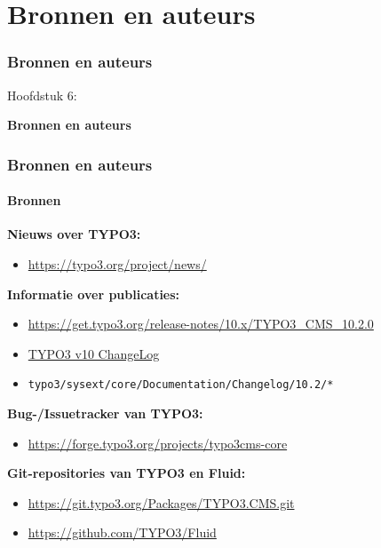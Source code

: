%

\section{Bronnen en auteurs}
\begin{frame}[fragile]
	\frametitle{Bronnen en auteurs}

	\begin{center}\huge{Hoofdstuk 6:}\end{center}
	\begin{center}\huge{\color{typo3darkgrey}\textbf{Bronnen en auteurs}}\end{center}

\end{frame}


\begin{frame}[fragile]
	\frametitle{Bronnen en auteurs}
	\framesubtitle{Bronnen}

	\textbf{Nieuws over TYPO3:}
		\begin{itemize}\smaller
			\item \url{https://typo3.org/project/news/}
		\end{itemize}

	\textbf{Informatie over publicaties:}
		\begin{itemize}\smaller
			\item \url{https://get.typo3.org/release-notes/10.x/TYPO3_CMS_10.2.0}
			\item \href{https://docs.typo3.org/c/typo3/cms-core/master/en-us/Changelog-10.html}{TYPO3 v10 ChangeLog}
			\item \texttt{typo3/sysext/core/Documentation/Changelog/10.2/*}
		\end{itemize}

	\textbf{Bug-/Issuetracker van TYPO3:}
		\begin{itemize}\smaller
			\item \url{https://forge.typo3.org/projects/typo3cms-core}
		\end{itemize}

	\textbf{Git-repositories van TYPO3 en Fluid:}
		\begin{itemize}\smaller
			\item \url{https://git.typo3.org/Packages/TYPO3.CMS.git}
			\item \url{https://github.com/TYPO3/Fluid}
		\end{itemize}

\end{frame}

